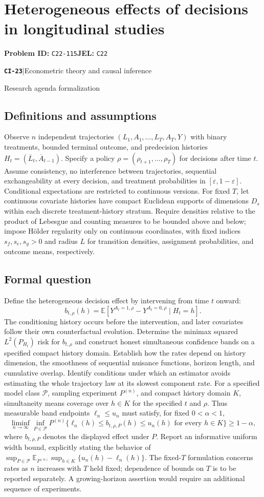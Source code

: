 \documentclass[11pt,a4paper]{article}
\newcommand{\E}{\mathbb E}
\newcommand{\entrymeta}[3]{{\sffamily\small\color{muted}\textbf{\texttt{#1}}\quad|\quad #2\par #3\par}}
\begin{document}
\section*{Heterogeneous effects of decisions in longitudinal studies}
\textbf{Problem ID:} \texttt{C22-115}\quad \textbf{JEL:} \texttt{C22}\par
\label{problem:OP-0502}
\label{beyond:CI-23}
\entrymeta{CI-23}{Econometric theory and causal inference}{Research agenda formalization}
\subsection*{Definitions and assumptions}
Observe $n$ independent trajectories $(L_1,A_1,\ldots,L_T,A_T,Y)$ with binary treatments, bounded terminal outcome, and predecision histories $H_t=(\overline L_t,\overline A_{t-1})$. Specify a policy $\rho=(\rho_{t+1},\ldots,\rho_T)$ for decisions after time $t$. Assume consistency, no interference between trajectories, sequential exchangeability at every decision, and treatment probabilities in $[\varepsilon,1-\varepsilon]$. Conditional expectations are restricted to continuous versions. For fixed $T$, let continuous covariate histories have compact Euclidean supports of dimensions $D_s$ within each discrete treatment-history stratum. Require densities relative to the product of Lebesgue and counting measures to be bounded above and below; impose H\"older regularity only on continuous coordinates, with fixed indices $s_f,s_e,s_y>0$ and radius $L$ for transition densities, assignment probabilities, and outcome means, respectively.
\subsection*{Formal question}
Define the heterogeneous decision effect by intervening from time $t$ onward:
\[
 b_{t,\rho}(h)=
 \E[Y^{A_t=1,\rho}-Y^{A_t=0,\rho}\mid H_t=h].
\]
The conditioning history occurs before the intervention, and later covariates follow their own counterfactual evolution. Determine the minimax squared $L^2(P_{H_t})$ risk for $b_{t,\rho}$ and construct honest simultaneous confidence bands on a specified compact history domain. Establish how the rates depend on history dimension, the smoothness of sequential nuisance functions, horizon length, and cumulative overlap. Identify conditions under which an estimator avoids estimating the whole trajectory law at its slowest component rate.
For a specified model class $\mathcal P$, sampling experiment $P^{(n)}$, and compact history domain $K$, simultaneity means coverage over $h\in K$ for the specified $t$ and $\rho$. Thus measurable band endpoints $\ell_n\leq u_n$ must satisfy, for fixed $0<\alpha<1$,
\[
 \liminf_{n\to\infty}\inf_{P\in\mathcal P}
 P^{(n)}\{\ell_n(h)\leq b_{t,\rho,P}(h)\leq u_n(h)
             \text{ for every }h\in K\}\geq1-\alpha,
\]
where $b_{t,\rho,P}$ denotes the displayed effect under $P$. Report an informative uniform width bound, explicitly stating the behavior of
$\sup_{P\in\mathcal P}\E_{P^{(n)}}\sup_{h\in K}\{u_n(h)-\ell_n(h)\}$.
The fixed-$T$ formulation concerns rates as $n$ increases with $T$ held fixed; dependence of bounds on $T$ is to be reported separately. A growing-horizon assertion would require an additional sequence of experiments.
\end{document}
